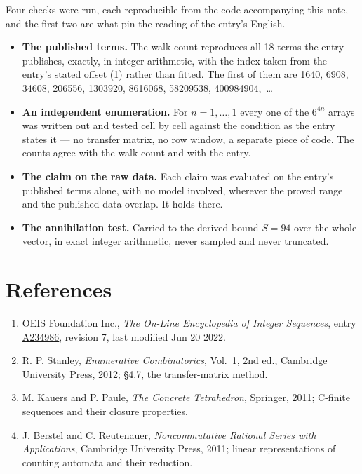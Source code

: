 \documentclass[11pt]{article}
\theoremstyle{definition}
\begin{document}
Four checks were run, each reproducible from the code accompanying this note, and the first two are what pin the reading of the entry's English.

\begin{itemize}

\item {\bfseries The published terms.} The walk count reproduces all 18 terms the entry publishes, exactly, in integer arithmetic, with the index taken from the entry's stated offset (1) rather than fitted. The first of them are 1640, 6908, 34608, 206556, 1303920, 8616068, 58209538, 400984904,~\dots

\item {\bfseries An independent enumeration.} For $n = 1,\dots,1$ every one of the $6^{4n}$ arrays was written out and tested cell by cell against the condition as the entry states it --- no transfer matrix, no row window, a separate piece of code. The counts agree with the walk count and with the entry.

\item {\bfseries The claim on the raw data.} Each claim was evaluated on the entry's published terms alone, with no model involved, wherever the proved range and the published data overlap. It holds there.

\item {\bfseries The annihilation test.} Carried to the derived bound $S = 94$ over the whole vector, in exact integer arithmetic, never sampled and never truncated.

\end{itemize}

\section{References}

\begin{enumerate}

\item OEIS Foundation Inc., \emph{The On-Line Encyclopedia of Integer Sequences}, entry \href{https://oeis.org/A234986}{A234986}, revision 7, last modified Jun 20 2022.

\item R. P. Stanley, \emph{Enumerative Combinatorics}, Vol.~1, 2nd ed., Cambridge University Press, 2012; \S4.7, the transfer-matrix method.

\item M. Kauers and P. Paule, \emph{The Concrete Tetrahedron}, Springer, 2011; C-finite sequences and their closure properties.

\item J. Berstel and C. Reutenauer, \emph{Noncommutative Rational Series with Applications}, Cambridge University Press, 2011; linear representations of counting automata and their reduction.

\end{enumerate}
\end{document}
